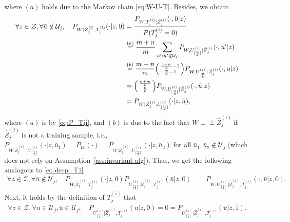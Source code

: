 \documentclass[onecolumn,romanappendices,10pt]{IEEEtran}
\newcommand{\Ucal}{{\mathcal U}}
\newcommand{\Zcal}{{\mathcal Z}}
\newcommand\indep{ \perp \!\!\! \perp}
\begin{document}
	where $(a)$ holds due to the Markov chain \eqref{eq:W-U-T}. Besides, we obtain
	\begin{equation}
		\begin{aligned}
			\forall z \in \Zcal, \forall \bar{u} \not\in \Ucal_j, \quad P_{W | \hat{Z}^{(i)}_j, T^{(i)}_j}(\cdot | z, 0) &= \frac{P_{W, T^{(i)}_j | \hat{Z}^{(i)}_j}(\cdot, 0 | z)}{P(T^{(i)}_j = 0)} \\
			&\overset{(a)}{=} \frac{m+n}{m} \sum_{\bar{u}': \bar{u}' \not\in \Ucal_j} P_{W, U^{(i)}_{[\frac{n}{k}]} | \hat{Z}^{(i)}_j}(\cdot, \bar{u}' | z) \\
			&\overset{(b)}{=} \frac{m+n}{m} \begin{psmallmatrix} \frac{n+m}{k}-1 \\ \frac{m}{k}-1 \end{psmallmatrix} P_{W, U^{(i)}_{[\frac{n}{k}]} | \hat{Z}^{(i)}_j}(\cdot, u | z) \\
			&= \begin{psmallmatrix} \frac{n+m}{k} \\ \frac{n}{k} \end{psmallmatrix} P_{W, U^{(i)}_{[\frac{n}{k}]} | \hat{Z}^{(i)}_j}(\cdot, \bar{u} | z) \\
			&= P_{W | \hat{Z}^{(i)}_j, U^{(i)}_{[\frac{n}{k}]}}(\cdot | z, \bar{u}),
		\end{aligned}\label{eq:eqv_P_T0_U}
	\end{equation}
	where $(a)$ is by \eqref{eq:P_Tij}, and $(b)$ is due to the fact that $W \indep \hat{Z}^{(i)}_j$ if $\hat{Z}^{(i)}_j$ is not a training sample, i.e., $P_{W | \hat{Z}^{(i)}_j, U^{(i)}_{[\frac{n}{k}]}}(\cdot | z, \bar{u}_1) = P_{W}(\cdot) = P_{W | \hat{Z}^{(i)}_j, U^{(i)}_{[\frac{n}{k}]}}(\cdot | z, \bar{u}_2)$ for all $\bar{u}_1, \bar{u}_2 \not\in \Ucal_j$ (which does not rely on Assumption~\ref{ass:invariant-alg}). Thus, we get the following analogous to \eqref{eq:decp_T1}
	\begin{equation}
		\begin{aligned}
			\forall z \in \Zcal, \forall \bar{u} \not\in \Ucal_j, \quad P_{W | \hat{Z}^{(i)}_j, T^{(i)}_j}(\cdot | z, 0) P_{U^{(i)}_{[\frac{n}{k}]} | \hat{Z}^{(i)}_j, T^{(i)}_j} (\bar{u} | z, 0)
			&= P_{W, U^{(i)}_{[\frac{n}{k}]} | \hat{Z}^{(i)}_j, T^{(i)}_j} (\cdot, \bar{u} | z, 0).
		\end{aligned}\label{eq:decp_T0}
	\end{equation}
	Next, it holds by the definition of $T^{(i)}_j$ that 
	\begin{equation}
		\begin{aligned}
			\forall z \in \Zcal, \forall u \in \Ucal_j, \bar{u} \in \Ucal_j, \quad P_{U^{(i)}_{[\frac{n}{k}]} | \hat{Z}^{(i)}_j, T^{(i)}_j} (u | z, 0) = 0 = P_{U^{(i)}_{[\frac{n}{k}]} | \hat{Z}^{(i)}_j, T^{(i)}_j} (\bar{u} | z, 1).
		\end{aligned}
	\end{equation}
\end{document}
